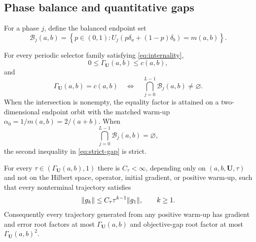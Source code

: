 \documentclass[letterpaper,twoside]{article}
\begin{document}
\subsection{Phase balance and quantitative gaps}

For a phase $j$, define the balanced endpoint set
\begin{equation}\label{eq:balance-set}
 \mathcal B_j(a,b)=
 \left\{p\in(0,1):
 U_j(p\delta_a+(1-p)\delta_b)=m(a,b)\right\}.
\end{equation}

\begin{theorem}\label{thm:strict-gap}
For every periodic selector family satisfying \eqref{eq:internality},
\begin{equation}\label{eq:strict-gap}
 0\le\Gamma_{\bm U}(a,b)\le c(a,b),
\end{equation}
and
\begin{equation}\label{eq:balance-iff}
 \Gamma_{\bm U}(a,b)=c(a,b)
 \quad\Longleftrightarrow\quad
 \bigcap_{j=0}^{L-1}\mathcal B_j(a,b)\ne\varnothing.
\end{equation}
When the intersection is nonempty, the equality factor is attained on a
two-dimensional endpoint orbit with the matched warm-up
$\alpha_0=1/m(a,b)=2/(a+b)$.  When
\begin{equation}\label{eq:balance-incompatible}
 \bigcap_{j=0}^{L-1}\mathcal B_j(a,b)=\varnothing,
\end{equation}
the second inequality in \eqref{eq:strict-gap} is strict.

For every $\tau\in(\Gamma_{\bm U}(a,b),1)$ there is
$C_\tau<\infty$, depending only on $(a,b,\bm U,\tau)$ and not on the
Hilbert space, operator, initial gradient, or positive warm-up, such that
every nonterminal trajectory satisfies
\begin{equation}\label{eq:tail-envelope}
 \lVert g_k\rVert\le C_\tau\tau^{k-1}\lVert g_1\rVert,
 \qquad k\ge1.
\end{equation}
Consequently every trajectory generated from any positive warm-up has
gradient and error root factors at most $\Gamma_{\bm U}(a,b)$ and
objective-gap root factor at most $\Gamma_{\bm U}(a,b)^2$.
\end{theorem}
\end{document}

